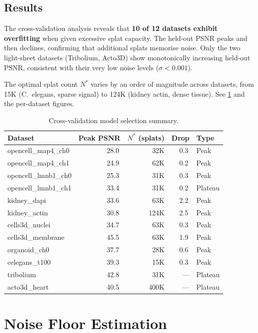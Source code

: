 \documentclass[11pt, a4paper]{article}
\theoremstyle{plain}
\theoremstyle{definition}
\theoremstyle{remark}
\newcommand{\dB}{\,\mathrm{dB}}
\begin{document}
\subsection{Results}
\label{sec:n2s-results}

The cross-validation analysis reveals that \textbf{10 of 12 datasets exhibit
overfitting} when given excessive splat capacity. The held-out PSNR
peaks and then declines, confirming that additional splats memorise
noise. Only the two light-sheet datasets (Tribolium, Acto3D) show
monotonically increasing held-out PSNR, consistent with their very low
noise levels ($\sigma < 0.001$).

The optimal splat count $N^*$ varies by an order of magnitude across
datasets, from 15K (C.~elegans, sparse signal) to 124K (kidney actin,
dense tissue). See \cref{tab:n2s-summary} and the per-dataset figures.

\begin{table}[H]
\centering
\caption{Cross-validation model selection summary.}
\label{tab:n2s-summary}
\small
\begin{tabular}{@{}lrrrl@{}}
\toprule
Dataset & Peak PSNR & $N^*$ (splats) & Drop & Type \\
\midrule
opencell\_map4\_ch0 & 28.0\dB & 32K & 0.3\dB & Peak \\
opencell\_map4\_ch1 & 24.9\dB & 62K & 0.2\dB & Peak \\
opencell\_lmnb1\_ch0 & 25.3\dB & 31K & 0.3\dB & Peak \\
opencell\_lmnb1\_ch1 & 33.4\dB & 31K & 0.2\dB & Plateau \\
kidney\_dapi & 33.6\dB & 63K & 2.2\dB & Peak \\
kidney\_actin & 30.8\dB & 124K & 2.5\dB & Peak \\
cells3d\_nuclei & 34.7\dB & 63K & 0.3\dB & Peak \\
cells3d\_membrane & 45.5\dB & 63K & 1.9\dB & Peak \\
organoid\_ch0 & 37.7\dB & 28K & 0.6\dB & Peak \\
celegans\_t100 & 39.3\dB & 15K & 0.3\dB & Peak \\
tribolium & 42.8\dB & 31K & ---  & Plateau \\
acto3d\_heart & 40.5\dB & 400K & --- & Plateau \\
\bottomrule
\end{tabular}
\end{table}


\section{Noise Floor Estimation}
\label{sec:noise-floor}
\end{document}
